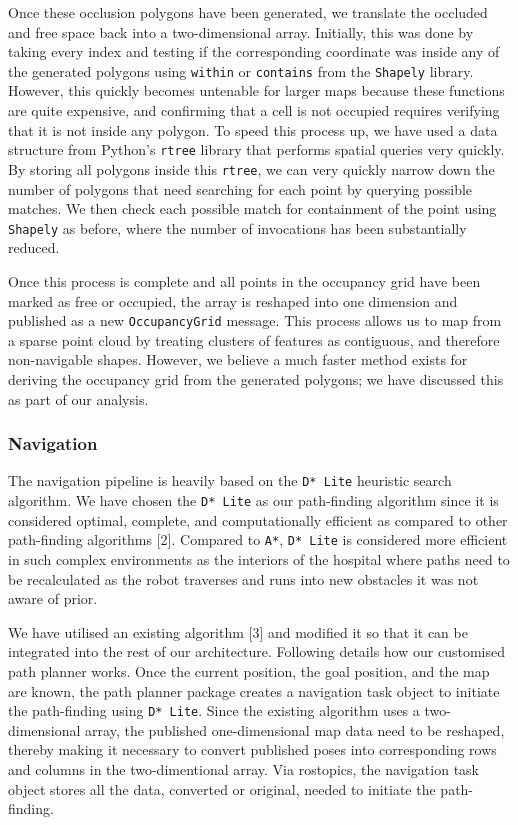 \documentclass[10pt,english]{article}
\begin{document}
Once these occlusion polygons have been generated, we translate the occluded and free space back into a two-dimensional array. Initially, this was done by taking every index and testing if the corresponding coordinate was inside any of the generated polygons using \texttt{within} or \texttt{contains} from the \texttt{Shapely} library. However, this quickly becomes untenable for larger maps because these functions are quite expensive, and confirming that a cell is not occupied requires verifying that it is not inside any polygon. To speed this process up, we have used a data structure from Python's \texttt{rtree} library that performs spatial queries very quickly. By storing all polygons inside this \texttt{rtree}, we can very quickly narrow down the number of polygons that need searching for each point by querying possible matches. We then check each possible match for containment of the point using \texttt{Shapely} as before, where the number of invocations has been substantially reduced.

Once this process is complete and all points in the occupancy grid have been marked as free or occupied, the array is reshaped into one dimension and published as a new \texttt{OccupancyGrid} message. This process allows us to map from a sparse point cloud by treating clusters of features as contiguous, and therefore non-navigable shapes. However, we believe a much faster method exists for deriving the occupancy grid from the generated polygons; we have discussed this as part of our analysis.

\subsubsection*{Navigation}

The navigation pipeline is heavily based on the \texttt{D* Lite} heuristic search algorithm.
We have chosen the \texttt{D* Lite} as our path-finding algorithm since it is considered optimal, complete, and computationally efficient as compared to other path-finding algorithms [2].
Compared to \texttt{A*}, \texttt{D* Lite} is considered more efficient in such complex environments as the interiors of the hospital where paths need to be recalculated as the robot traverses and runs into new obstacles it was not aware of prior.

We have utilised an existing algorithm [3] and modified it so that it can be integrated into the rest of our architecture. Following details how our customised path planner works.
Once the current position, the goal position, and the map are known, the path planner package creates a navigation task object to initiate the path-finding using \texttt{D* Lite}.
Since the existing algorithm uses a two-dimensional array, the published one-dimensional map data need to be reshaped, thereby making it necessary to convert published poses into corresponding rows and columns in the two-dimentional array. Via rostopics, the navigation task object stores all the data, converted or original, needed to initiate the path-finding.
\end{document}

